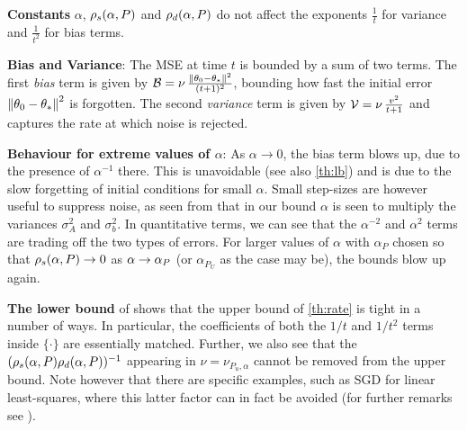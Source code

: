 \textbf{Constants} {$\alpha$, $\rho_s(\alpha,P)$ and $\rho_d(\alpha,P)$} do not affect the exponents $\frac{1}{t}$ for variance and $\frac{1}{t^2}$ for bias terms.%

\textbf{Bias and Variance}: The MSE at time $t$ is bounded by a sum of two terms. The first \emph{bias} term is given by $\mathcal{B}=\nu \,\frac{\left\| \theta_0-\theta_*\right\|^2}{(t+1)^2}$, bounding how fast the initial error $\left\| \theta_0-\theta_*\right\|^2$ is forgotten. 
The second \emph{variance} term is  given by $\mathcal{V}=\nu\, \frac{v^2}{t+1} $ and captures the rate at which noise is rejected.

\textbf{Behaviour for extreme values of $\alpha$}: 
As $\alpha\to 0$, the bias term blows up, due to the presence of $\alpha^{-1}$ there. This is unavoidable (see also \cref{th:lb}) and is due to the slow forgetting of initial conditions for small $\alpha$. Small step-sizes are however useful to suppress noise, as seen from that in our bound $\alpha$ is seen to multiply the variances $\sigma^2_A$ and $\sigma^2_b$. In quantitative terms, we can see that the $\alpha^{-2}$ and $\alpha^2$ terms are trading off the two types of errors. 
For larger values of $\alpha$ with $\alpha_P$ chosen so that $\rho_s(\alpha,P)\rightarrow 0$ as $\alpha\rightarrow \alpha_{P}$  (or $\alpha_{P_U}$ as the case may be), the bounds blow up again.

\textbf{The lower bound} of  shows that the upper bound of \cref{th:rate} is tight in a number of ways.
In particular, the coefficients of both the $1/t$ and $1/t^2$ terms inside $\{ \cdot \}$ are essentially matched.
Further, we also see that
the $(\rho_s(\alpha,P)\rho_d(\alpha,P))^{-1}$ appearing in $\nu = \nu_{P_u,\alpha}$ cannot be removed from the upper bound. 
Note however that there are specific examples, such as SGD for linear least-squares,
where this latter factor can in fact be avoided (for further remarks see ).



